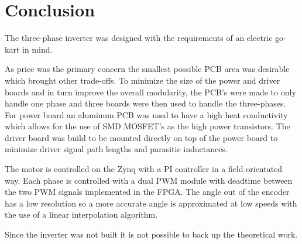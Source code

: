 \section{Conclusion}
\label{sec:conclusion}



The three-phase inverter was designed with the requirements of an electric go-kart in mind. 

As price was the primary concern the smallest possible PCB area was desirable which brought other trade-offs. 
To minimize the size of the power and driver boards and in turn improve the overall modularity, the PCB's were made to only handle one phase and three boards were then used to handle the three-phases.
For power board an aluminum PCB was used to have a high heat conductivity which allows for the use of SMD MOSFET's as the high power transistors. The driver board was build to be mounted directly on top of the power board to minimize driver signal path lengths and parasitic inductances.

The motor is controlled on the Zynq with a PI controller in a field orientated way. Each phase is controlled with a dual PWM module with deadtime between the two PWM signals implemented in the FPGA.
The angle out of the encoder has a low resolution so a more accurate angle is approximated at low speeds with the use of a linear interpolation algorithm. 

Since the inverter was not built it is not possible to back up the theoretical work.

